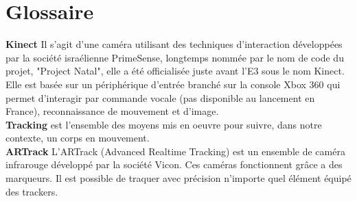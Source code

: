 \chapter{Glossaire}

\textbf{Kinect} Il s'agit d'une caméra utilisant des techniques d'interaction développées par la société israélienne PrimeSense, longtemps nommée par le nom de code du projet, "Project Natal", elle a été officialisée juste avant l'E3 sous le nom Kinect. Elle est basée sur un périphérique d'entrée branché sur la console Xbox 360 qui permet d'interagir par commande vocale (pas disponible au lancement en France), reconnaissance de mouvement et d'image.\\

\textbf{Tracking} est l'ensemble des moyens mis en oeuvre pour suivre, dans
notre contexte, un corps en mouvement.\\

\textbf{ARTrack} L’ARTrack (Advanced Realtime Tracking) est un ensemble de caméra infrarouge développé par la société Vicon. Ces caméras fonctionnent grâce a des marqueurs. Il est possible de traquer avec précision n’importe quel élément équipé des trackers.\\
